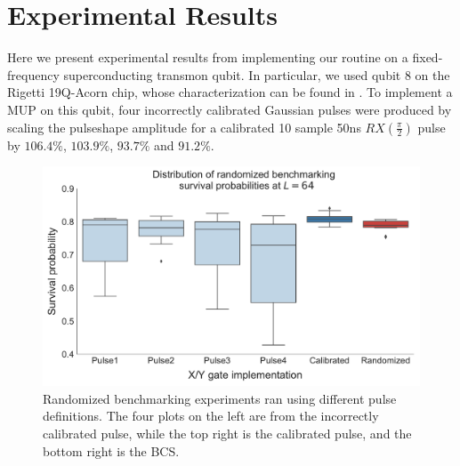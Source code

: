 \documentclass[aps,nofootinbib,pra,notitlepage,twocolumn]{revtex4-1}
\begin{document}

\section{Experimental Results}
\label{sec:experimental_results}
Here we present experimental results from implementing our routine on a fixed-frequency superconducting transmon qubit. In particular, we used qubit 8 on the Rigetti 19Q-Acorn chip, whose characterization can be found in \cite{1712.05771}. To implement a MUP on this qubit, four incorrectly calibrated Gaussian pulses were produced by scaling the pulseshape amplitude for a calibrated 10 sample 50ns $RX(\frac{\pi}{2})$ pulse by $106.4\%$,  $103.9\%$, $93.7\%$ and $91.2\%$.


\begin{figure}[H]
  \centering
  \includegraphics[width=\columnwidth]{rb_data.pdf}
  \caption{Randomized benchmarking experiments ran using different pulse definitions. The four plots on the left are from the incorrectly calibrated pulse, while the top right is the calibrated pulse, and the bottom right is the BCS.}
  \label{fig:rb}
\end{figure}
\end{document}
